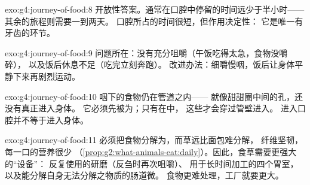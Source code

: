 \begin{solution}{exo:g4:journey-of-food:8}
开放性答案。通常在口腔中停留的时间远少于半小时——
其余的旅程则需要一到两天。
口腔所占的时间很短，但作用决定性：
它是唯一有牙齿的环节。
\end{solution}

\begin{solution}{exo:g4:journey-of-food:9}
问题所在：没有充分咀嚼（午饭吃得太急，食物没嚼碎），
以及饭后休息不足（吃完立刻奔跑）。
改进办法：细嚼慢咽，饭后让身体平静下来再剧烈运动。
\end{solution}

\begin{solution}{exo:g4:journey-of-food:10}
咽下的食物仍在管道之内——
就像甜甜圈中间的孔，还没有真正进入身体。
它必须先被为；只有在中，
这些才会穿过管壁进入。
进入口腔并不等于进入身体。
\end{solution}

\begin{solution}{exo:g4:journey-of-food:11}
必须把食物分解为，而草远比面包难分解，
纤维坚韧，
每一口的营养很少
（\cref{prop:g2:what-animals-eat:daily}）。因此，食草需要更强大的“设备”：
反复使用的研磨（反刍时再次咀嚼）、
用于长时间加工的四个胃室，
以及能分解自身无法分解之物质的肠道微。
食物更难处理，工厂就要更大。
\end{solution}
